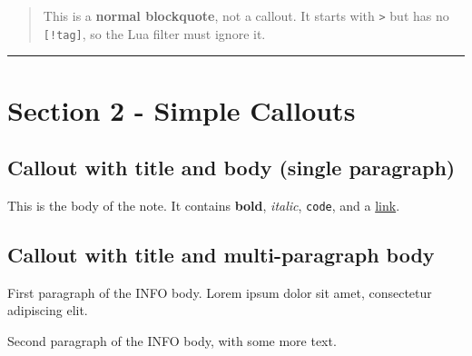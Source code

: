 \begin{tcolorbox}[breakable,colback=ocGryBack,colframe=ocGryFrame,coltitle=ocGryTitle,left=3mm,boxed title style={left=1mm},title={\hspace*{-2.5mm}\iconInfo\; md2pdf - inner without explicit \texttt{shift-heading=0}}]
\begin{quote}
This is a \textbf{normal blockquote}, not a callout. It starts with
\texttt{\textgreater{}} but has no \texttt{{[}!tag{]}}, so the Lua
filter must ignore it.
\end{quote}

\begin{center}\rule{0.5\linewidth}{0.5pt}\end{center}

\section*{Section 2 - Simple
Callouts}\label{inner-2-section-2---simple-callouts}

\subsection*{Callout with title and body (single
paragraph)}\label{inner-2-callout-with-title-and-body-single-paragraph}

\begin{tcolorbox}[breakable,colback=ocGryBack,colframe=ocGryFrame,coltitle=ocGryTitle,left=3mm,boxed title style={left=1mm},title={\hspace*{-2.5mm}\iconNote\; A simple NOTE callout}]

This is the body of the note. It contains \textbf{bold}, \emph{italic},
\texttt{code}, and a \href{https://example.com}{link}.

\end{tcolorbox}

\subsection*{Callout with title and multi-paragraph
body}\label{inner-2-callout-with-title-and-multi-paragraph-body}

\begin{tcolorbox}[breakable,colback=ocGryBack,colframe=ocGryFrame,coltitle=ocGryTitle,left=3mm,boxed title style={left=1mm},title={\hspace*{-2.5mm}\iconInfo\; Info with multi-paragraph body}]

First paragraph of the INFO body. Lorem ipsum dolor sit amet,
consectetur adipiscing elit.

Second paragraph of the INFO body, with some more text.

\end{tcolorbox}


\end{tcolorbox}
